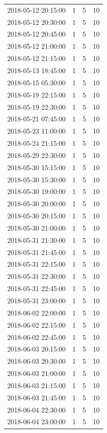 \begin{tabular}{lrrr}
2018-05-12 20:15:00 & 1 & 5 & 10 \\
2018-05-12 20:30:00 & 1 & 5 & 10 \\
2018-05-12 20:45:00 & 1 & 5 & 10 \\
2018-05-12 21:00:00 & 1 & 5 & 10 \\
2018-05-12 21:15:00 & 1 & 5 & 10 \\
2018-05-13 18:45:00 & 1 & 5 & 10 \\
2018-05-15 05:30:00 & 1 & 5 & 10 \\
2018-05-19 22:15:00 & 1 & 5 & 10 \\
2018-05-19 22:30:00 & 1 & 5 & 10 \\
2018-05-21 07:45:00 & 1 & 5 & 10 \\
2018-05-23 11:00:00 & 1 & 5 & 10 \\
2018-05-24 21:15:00 & 1 & 5 & 10 \\
2018-05-29 22:30:00 & 1 & 5 & 10 \\
2018-05-30 15:15:00 & 1 & 5 & 10 \\
2018-05-30 15:30:00 & 1 & 5 & 10 \\
2018-05-30 19:00:00 & 1 & 5 & 10 \\
2018-05-30 20:00:00 & 1 & 5 & 10 \\
2018-05-30 20:15:00 & 1 & 5 & 10 \\
2018-05-30 21:00:00 & 1 & 5 & 10 \\
2018-05-31 21:30:00 & 1 & 5 & 10 \\
2018-05-31 21:45:00 & 1 & 5 & 10 \\
2018-05-31 22:15:00 & 1 & 5 & 10 \\
2018-05-31 22:30:00 & 1 & 5 & 10 \\
2018-05-31 22:45:00 & 1 & 5 & 10 \\
2018-05-31 23:00:00 & 1 & 5 & 10 \\
2018-06-02 22:00:00 & 1 & 5 & 10 \\
2018-06-02 22:15:00 & 1 & 5 & 10 \\
2018-06-02 22:45:00 & 1 & 5 & 10 \\
2018-06-03 20:15:00 & 1 & 5 & 10 \\
2018-06-03 20:30:00 & 1 & 5 & 10 \\
2018-06-03 21:00:00 & 1 & 5 & 10 \\
2018-06-03 21:15:00 & 1 & 5 & 10 \\
2018-06-03 21:45:00 & 1 & 5 & 10 \\
2018-06-04 22:30:00 & 1 & 5 & 10 \\
2018-06-04 23:00:00 & 1 & 5 & 10 \\

\end{tabular}
